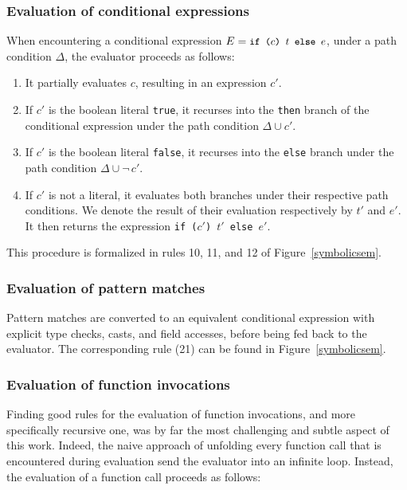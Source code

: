 \documentclass[a4paper,twoside]{article}
\newcommand{\InlineS}[1]{\lstinline[language=PureScala,basicstyle=\small\ttfamily,columns=fixed]|#1|}
\newcommand{\RefFig}[1]{Figure~\ref{#1}}
\newcommand{\stt}[1]{\texttt{\small{#1}}}
\begin{document}
\subsubsection*{Evaluation of conditional expressions}

When encountering a conditional expression $E = \stt{if ($c$) $t$ else $e$}$, under a path condition $\Delta$, the evaluator proceeds as follows:

\begin{enumerate}
\item It partially evaluates $c$, resulting in an expression $c'$.
\item If $c'$ is the boolean literal \InlineS{true}, it recurses into the \stt{then} branch of the conditional expression under the path condition $\Delta \cup c'$.
\item If $c'$ is the boolean literal \InlineS{false}, it recurses into the 
\stt{else} branch under the path condition $\Delta \cup \neg\,c'$.
\item If $c'$ is not a literal, it evaluates both branches under their respective path conditions. We denote the result of their evaluation respectively by $t'$ and $e'$. It then returns the expression \stt{if ($c'$) $t'$ else $e'$}.
\end{enumerate}

This procedure is formalized in rules 10, 11, and 12 of \RefFig{symbolicsem}.

\subsubsection*{Evaluation of pattern matches}

Pattern matches are converted to an equivalent conditional expression with explicit type checks, casts, and field accesses, before being fed back to the evaluator. The corresponding rule (21) can be found in \RefFig{symbolicsem}.

\subsubsection*{Evaluation of function invocations}

Finding good rules for the evaluation of function invocations, and more specifically recursive one, was by far the most challenging and subtle aspect of this work. Indeed, the naive approach of unfolding every function call that is encountered during evaluation send the evaluator into an infinite loop. Instead, the evaluation of a function call proceeds as follows:
\end{document}
